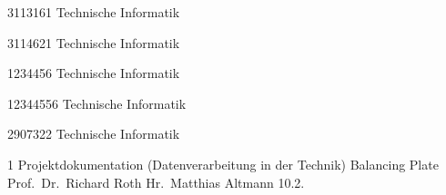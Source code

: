 \documentclass[12pt,a4paper,bibliography=totoc,listof=totoc]{scrartcl}
\begin{document}
{3113161}						%
{Technische Informatik}			%

{3114621}						%
{Technische Informatik}			%

{1234456}						%
{Technische Informatik}			%

{12344556}						%
{Technische Informatik}			%

{2907322}						%
{Technische Informatik}			%


\MyTitelseite{}
{1}								%
{Projektdokumentation (Datenverarbeitung in der Technik)}			%
{Balancing Plate}				%
{Prof.\ Dr.\ Richard Roth}   %
{ Hr.\ Matthias Altmann}	%
{10.2.\the\year}				%

\setcounter{page}{1} 




\tableofcontents
\pagebreak
\end{document}
